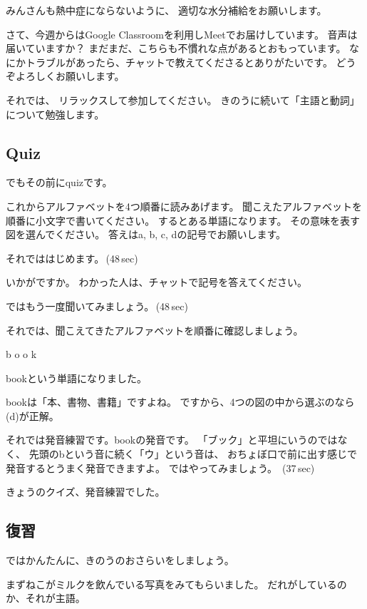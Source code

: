 \documentclass[book,jafontscale=0.9247]{jlreq}
\begin{document}
みんさんも熱中症にならないように、
適切な水分補給をお願いします。

さて、今週からはGoogle Classroomを利用しMeetでお届けしています。
音声は届いていますか？
まだまだ、こちらも不慣れな点があるとおもっています。
なにかトラブルがあったら、チャットで教えてくださるとありがたいです。
どうぞよろしくお願いします。

それでは、
リラックスして参加してください。
{\large \ComputerMouse}
きのうに続いて「主語と動詞」について勉強します。

{\large \ComputerMouse}
\subsection{Quiz}
でもその前にquizです。

これからアルファベットを4つ順番に読みあげます。
聞こえたアルファベットを順番に小文字で書いてください。
するとある単語になります。
その意味を表す図を選んでください。
答えはa, b, c, dの記号でお願いします。


それでははじめます。\faVolumeUp\,(48\,sec)

いかがですか。
わかった人は、チャットで記号を答えてください。


ではもう一度聞いてみましょう。\faVolumeUp\,(48\,sec)

それでは、聞こえてきたアルファベットを順番に確認しましょう。{\large \ComputerMouse}

b
{\large \ComputerMouse}
o
{\large \ComputerMouse}
o
{\large \ComputerMouse}
k

bookという単語になりました。

bookは「本、書物、書籍」ですよね。
ですから、4つの図の中から選ぶのなら(d)が正解。

それでは発音練習です。bookの発音です。
「ブック」と平坦にいうのではなく、
先頭のbという音に続く「ウ」という音は、
おちょぼ口で前に出す感じで発音するとうまく発音できますよ。
ではやってみましょう。
\faVolumeUp\,(37\,sec)

きょうのクイズ、発音練習でした。

{\large \ComputerMouse}

\subsection{復習}
ではかんたんに、きのうのおさらいをしましょう。

まずねこがミルクを飲んでいる写真をみてもらいました。
だれがしているのか、それが主語。
\end{document}
